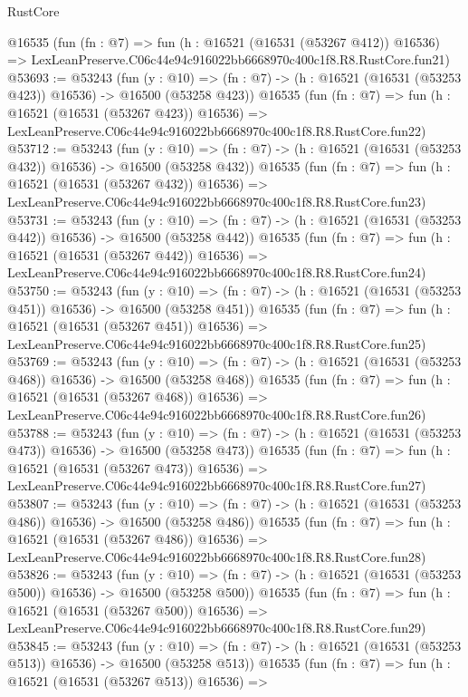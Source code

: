 \begin{lexlean}{RustCore}
\begin{coremodule}
    @16535
    (fun (fn : @7) =>
    fun (h : @16521 (@16531 (@53267 @412)) @16536) =>
    LexLeanPreserve.C06c44e94c916022bb6668970c400c1f8.R8.RustCore.fun21)
@53693 := @53243
    (fun (y : @10) =>
    (fn : @7) -> (h : @16521 (@16531 (@53253 @423)) @16536) -> @16500 (@53258 @423))
    @16535
    (fun (fn : @7) =>
    fun (h : @16521 (@16531 (@53267 @423)) @16536) =>
    LexLeanPreserve.C06c44e94c916022bb6668970c400c1f8.R8.RustCore.fun22)
@53712 := @53243
    (fun (y : @10) =>
    (fn : @7) -> (h : @16521 (@16531 (@53253 @432)) @16536) -> @16500 (@53258 @432))
    @16535
    (fun (fn : @7) =>
    fun (h : @16521 (@16531 (@53267 @432)) @16536) =>
    LexLeanPreserve.C06c44e94c916022bb6668970c400c1f8.R8.RustCore.fun23)
@53731 := @53243
    (fun (y : @10) =>
    (fn : @7) -> (h : @16521 (@16531 (@53253 @442)) @16536) -> @16500 (@53258 @442))
    @16535
    (fun (fn : @7) =>
    fun (h : @16521 (@16531 (@53267 @442)) @16536) =>
    LexLeanPreserve.C06c44e94c916022bb6668970c400c1f8.R8.RustCore.fun24)
@53750 := @53243
    (fun (y : @10) =>
    (fn : @7) -> (h : @16521 (@16531 (@53253 @451)) @16536) -> @16500 (@53258 @451))
    @16535
    (fun (fn : @7) =>
    fun (h : @16521 (@16531 (@53267 @451)) @16536) =>
    LexLeanPreserve.C06c44e94c916022bb6668970c400c1f8.R8.RustCore.fun25)
@53769 := @53243
    (fun (y : @10) =>
    (fn : @7) -> (h : @16521 (@16531 (@53253 @468)) @16536) -> @16500 (@53258 @468))
    @16535
    (fun (fn : @7) =>
    fun (h : @16521 (@16531 (@53267 @468)) @16536) =>
    LexLeanPreserve.C06c44e94c916022bb6668970c400c1f8.R8.RustCore.fun26)
@53788 := @53243
    (fun (y : @10) =>
    (fn : @7) -> (h : @16521 (@16531 (@53253 @473)) @16536) -> @16500 (@53258 @473))
    @16535
    (fun (fn : @7) =>
    fun (h : @16521 (@16531 (@53267 @473)) @16536) =>
    LexLeanPreserve.C06c44e94c916022bb6668970c400c1f8.R8.RustCore.fun27)
@53807 := @53243
    (fun (y : @10) =>
    (fn : @7) -> (h : @16521 (@16531 (@53253 @486)) @16536) -> @16500 (@53258 @486))
    @16535
    (fun (fn : @7) =>
    fun (h : @16521 (@16531 (@53267 @486)) @16536) =>
    LexLeanPreserve.C06c44e94c916022bb6668970c400c1f8.R8.RustCore.fun28)
@53826 := @53243
    (fun (y : @10) =>
    (fn : @7) -> (h : @16521 (@16531 (@53253 @500)) @16536) -> @16500 (@53258 @500))
    @16535
    (fun (fn : @7) =>
    fun (h : @16521 (@16531 (@53267 @500)) @16536) =>
    LexLeanPreserve.C06c44e94c916022bb6668970c400c1f8.R8.RustCore.fun29)
@53845 := @53243
    (fun (y : @10) =>
    (fn : @7) -> (h : @16521 (@16531 (@53253 @513)) @16536) -> @16500 (@53258 @513))
    @16535
    (fun (fn : @7) =>
    fun (h : @16521 (@16531 (@53267 @513)) @16536) =>

\end{coremodule}
\end{lexlean}
